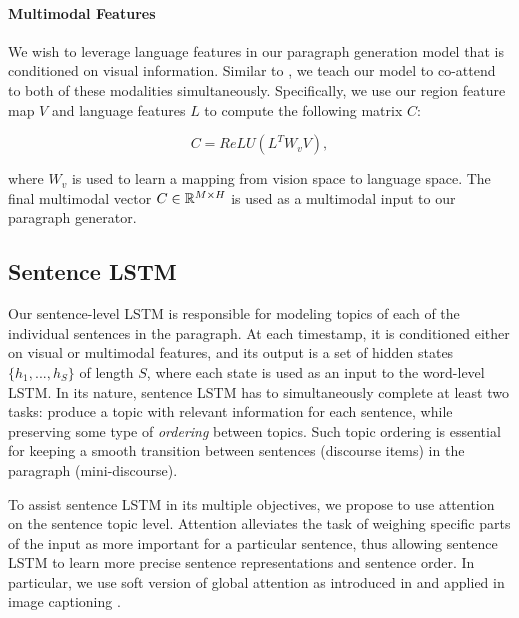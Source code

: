 \documentclass[11pt,a4paper]{article}
\newcommand{\R}{\mathbb{R}}
\begin{document}
\paragraph{Multimodal Features} We wish to leverage language features in our paragraph generation model that is conditioned on visual information.
Similar to \cite{vqaLU16}, we teach our model to co-attend to both of these modalities simultaneously.
Specifically, we use our region feature map $V$ and language features $L$ to compute the following matrix $C$:

\begin{equation}
    C = ReLU(L^TW_vV),
\end{equation}

where $W_v$ is used to learn a mapping from vision space to language space. The final multimodal vector $C \in \R\sp{M \times H}$ is used as a multimodal input to our paragraph generator.


\subsection{Sentence LSTM}
Our sentence-level LSTM is responsible for modeling topics of each of the individual sentences in the paragraph.
At each timestamp, it is conditioned either on visual or multimodal features, and its output is a set of hidden states $\{h_1, ..., h_S\}$ of length $S$, where each state is used as an input to the word-level LSTM. %
In its nature, sentence LSTM has to simultaneously complete at least two tasks: produce a topic with relevant information for each sentence, while preserving some type of \textit{ordering} between topics.
Such topic ordering is essential for keeping a smooth transition between sentences (discourse items) in the paragraph (mini-discourse).

To assist sentence LSTM in its multiple objectives, we propose to use attention on the sentence topic level.
Attention alleviates the task of weighing specific parts of the input as more important for a particular sentence, thus allowing sentence LSTM to learn more precise sentence representations and sentence order.
In particular, we use soft version of global attention as introduced in \cite{bahdanau2014neural} and applied in image captioning \cite{xu2015attend,luong2015effective}.
\end{document}
